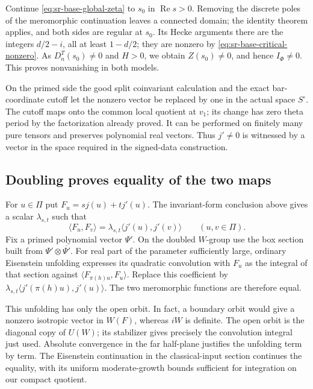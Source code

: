 Continue \eqref{eq:sr-base-global-zeta} to \(s_0\) in
\(\operatorname{Re}s>0\). Removing the discrete poles of
the meromorphic continuation leaves a connected domain;
the identity theorem applies, and both sides are regular
at \(s_0\). Its Hecke arguments there are the integers
\(d/2-i\), all at least \(1-d/2\); they are nonzero by
\eqref{eq:sr-base-critical-nonzero}. As \(D^T_n(s_0)\ne0\)
and \(H>0\), we obtain \(Z(s_0)\ne0\), and hence
\(I_\Phi\ne0\). This proves nonvanishing in both models.

On the primed side the good split coinvariant calculation
and the exact bar-coordinate cutoff let the nonzero vector
be replaced by one in the actual space \(S^\circ\).
The cutoff maps onto the common local quotient at \(v_1\);
its change has zero theta period by the factorization
already proved. It can be performed on finitely many pure
tensors and preserves polynomial real vectors. Thus
\(j'\ne0\) is witnessed by a vector in the space required
in the signed-data construction.

\subsection{Doubling proves equality of the two maps}

For \(u\in\Pi\) put \(F_u=sj(u)+tj'(u)\).
The invariant-form conclusion above gives a scalar
\(\lambda_{s,t}\) such that
\[
       \langle F_u,F_v\rangle
              =\lambda_{s,t}
                     \langle j'(u),j'(v)\rangle
                                     \qquad(u,v\in\Pi).
\]
Fix a primed polynomial vector \(\Psi'\).
On the doubled \(W\)-group use the box section built from
\(\Psi'\otimes\overline{\Psi'}\). For real part of the
parameter sufficiently large, ordinary Eisenstein unfolding
expresses its quadratic convolution with \(F_u\) as the
integral of that section against
\(\langle F_{\pi(h)u},F_u\rangle\).
Replace this coefficient by
\(\lambda_{s,t}\langle j'(\pi(h)u),j'(u)\rangle\).
The two meromorphic functions are therefore equal.

This unfolding has only the open orbit. In fact, a boundary
orbit would give a nonzero isotropic vector in \(W(F)\),
whereas \(iW\) is definite. The open orbit is the diagonal
copy of \(U(W)\); its stabilizer gives precisely the
convolution integral just used. Absolute convergence in
the far half-plane justifies the unfolding term by term.
The Eisenstein continuation in the classical-input section
continues the equality, with its uniform moderate-growth
bounds sufficient for integration on our compact quotient.

